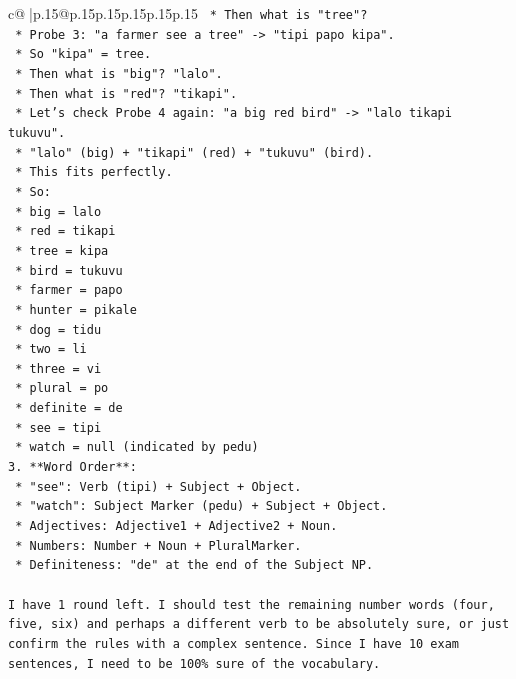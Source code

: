 \documentclass{article}
\begin{document}
{\begin{supertabular}{c@{$\;$}|p{.15\linewidth}@{}p{.15\linewidth}p{.15\linewidth}p{.15\linewidth}p{.15\linewidth}p{.15\linewidth}}
{{{\texttt{        *   Then what is "tree"?} \\
\texttt{        *   Probe 3: "a farmer see a tree" {-}> "tipi papo kipa".} \\
\texttt{        *   So "kipa" = tree.} \\
\texttt{        *   Then what is "big"? "lalo".} \\
\texttt{        *   Then what is "red"? "tikapi".} \\
\texttt{        *   Let's check Probe 4 again: "a big red bird" {-}> "lalo tikapi tukuvu".} \\
\texttt{        *   "lalo" (big) + "tikapi" (red) + "tukuvu" (bird).} \\
\texttt{        *   This fits perfectly.} \\
\texttt{        *   So:} \\
\texttt{            *   big = lalo} \\
\texttt{            *   red = tikapi} \\
\texttt{            *   tree = kipa} \\
\texttt{            *   bird = tukuvu} \\
\texttt{            *   farmer = papo} \\
\texttt{            *   hunter = pikale} \\
\texttt{            *   dog = tidu} \\
\texttt{            *   two = li} \\
\texttt{            *   three = vi} \\
\texttt{            *   plural = po} \\
\texttt{            *   definite = de} \\
\texttt{            *   see = tipi} \\
\texttt{            *   watch = null (indicated by pedu)} \\
\texttt{3.  **Word Order**:} \\
\texttt{    *   "see": Verb (tipi) + Subject + Object.} \\
\texttt{    *   "watch": Subject Marker (pedu) + Subject + Object.} \\
\texttt{    *   Adjectives: Adjective1 + Adjective2 + Noun.} \\
\texttt{    *   Numbers: Number + Noun + PluralMarker.} \\
\texttt{    *   Definiteness: "de" at the end of the Subject NP.} \\
\\ 
\texttt{I have 1 round left. I should test the remaining number words (four, five, six) and perhaps a different verb to be absolutely sure, or just confirm the rules with a complex sentence. Since I have 10 exam sentences, I need to be 100\% sure of the vocabulary.} \\
}}}
\end{supertabular}}
\end{document}
